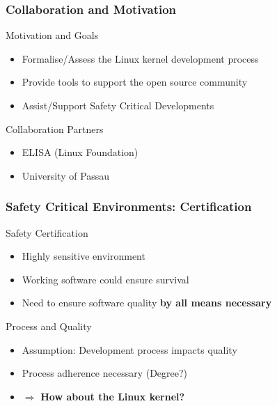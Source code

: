 \documentclass[9pt]{beamer}
\begin{document}

	\begin{frame}
	\frametitle{Collaboration and Motivation}
		\begin{block}{Motivation and Goals}
			\begin{itemize}
				\item Formalise/Assess the Linux kernel development process
				\item Provide tools to support the open source community
				\item Assist/Support Safety Critical Developments
			\end{itemize}
		\end{block}
		\begin{block}{Collaboration Partners}
			\begin{itemize}
				\item ELISA (Linux Foundation)
				\item University of Passau
			\end{itemize}
		\end{block}
	\end{frame}

	\begin{frame}
	\frametitle{Safety Critical Environments: Certification}
		\begin{block}{Safety Certification}
			\begin{itemize}
				\item Highly sensitive environment
				\item Working software could ensure survival
				\item Need to ensure software quality \textbf{by all means necessary}
			\end{itemize}
		\end{block}
		\begin{block}{Process and Quality}
			\begin{itemize}
				\item Assumption: Development process impacts quality
				\item Process adherence necessary (Degree?)
				\item $\Rightarrow$ \textbf{How about the Linux kernel?}
			\end{itemize} %
		\end{block}

	\end{frame}
\end{document}
